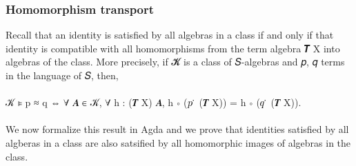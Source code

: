 \subsubsection{Homomorphism transport}\label{homomorphism-transport}
Recall that an identity is satisfied by all algebras in a class if and only if that identity is compatible with all homomorphisms from the term algebra \af 𝑻 \ab X into algebras of the class. More precisely, if 𝓚 is a class of 𝑆-algebras and 𝑝, 𝑞 terms in the language of 𝑆, then,\\
\\
\ab 𝒦 \aof ⊧ \ab p \aof ≈ \ab q \hskip3mm ⇔ \hskip3mm
\as ∀ \ab 𝑨 \aof ∈ \ab 𝒦, \as ∀ \ab h \as :  (\af 𝑻 \ab X) \ab 𝑨, \ab h \aof ∘ (\ab 𝑝 \aof ̇ (\af 𝑻 \ab X)) \as = \ab h \aof ∘ (\ab 𝑞 \aof ̇ (\af 𝑻 \ab X)).\\
\\
We now formalize this result in Agda and we prove that identities satisfied by all algberas in a class are also satsified by all homomorphic images of algebras in the class.
\ccpad
